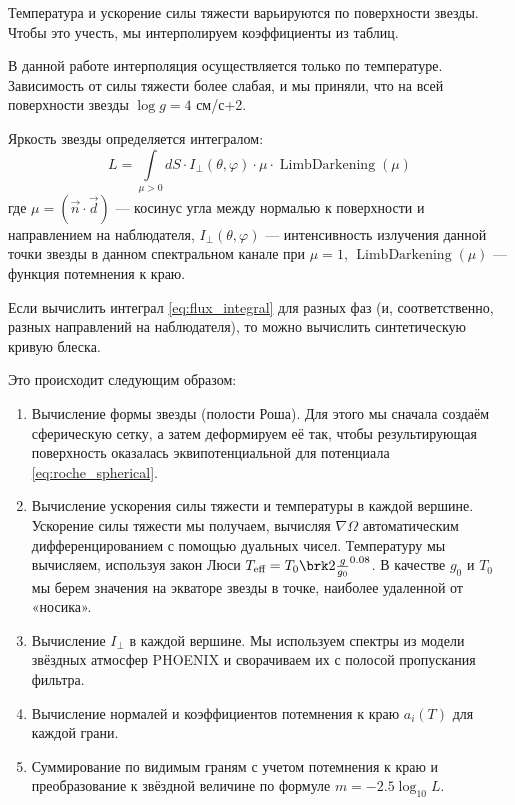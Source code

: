 Температура и ускорение силы тяжести варьируются по поверхности звезды. Чтобы это учесть, мы интерполируем коэффициенты из таблиц.

В данной работе интерполяция осуществляется только по температуре. Зависимость от силы тяжести более слабая, и мы приняли, что на всей поверхности звезды $\log g = 4$ см/с+2.



Яркость звезды определяется интегралом:
\begin{equation}
L = \int\limits_{\mu > 0}
dS \cdot
I_\perp (\theta, \varphi) \cdot \mu \cdot
\operatorname{LimbDarkening}(\mu)
\label{eq:flux_integral}
\end{equation}
где $\mu = (\vec n \cdot \vec d)$ --- косинус угла между нормалью к поверхности и направлением на наблюдателя, $I_\perp(\theta, \varphi)$ --- интенсивность излучения данной точки звезды в данном спектральном канале при $\mu = 1$, $\operatorname{LimbDarkening}(\mu)$ --- функция потемнения к краю.

Если вычислить интеграл \ref{eq:flux_integral} для разных фаз (и, соответственно, разных направлений на наблюдателя), то можно вычислить синтетическую кривую блеска.

Это происходит следующим образом:
\begin{enumerate}
    \item Вычисление формы звезды (полости Роша). Для этого мы сначала создаём сферическую сетку, а затем деформируем её так, чтобы результирующая поверхность оказалась эквипотенциальной для потенциала \eqref{eq:roche_spherical}.
    \item Вычисление ускорения силы тяжести и температуры в каждой вершине. Ускорение силы тяжести мы получаем, вычисляя $\nabla \Omega$ автоматическим дифференцированием с помощью дуальных чисел. Температуру мы вычисляем, используя закон Люси $T_\text{eff} = T_0 \brk2{\frac{g}{g_0}}^{0.08}$. В качестве $g_0$ и $T_0$ мы берем значения на экваторе звезды в точке, наиболее удаленной от «носика».
    \item Вычисление $I_\perp$ в каждой вершине. Мы используем спектры из модели звёздных атмосфер PHOENIX и сворачиваем их с полосой пропускания фильтра.
    \item Вычисление нормалей и коэффициентов потемнения к краю $a_i(T)$ для каждой грани.
    \item Суммирование по видимым граням с учетом потемнения к краю и преобразование к звёздной величине по формуле $m = -2.5 \log_{10} L$.
\end{enumerate}

